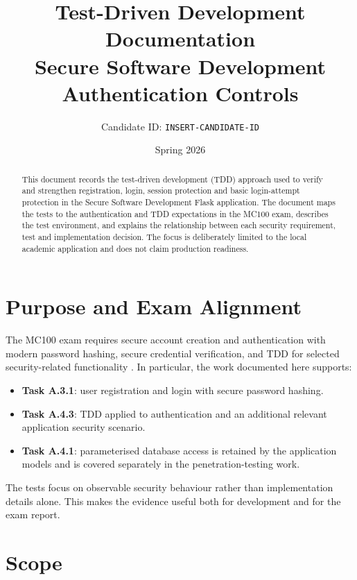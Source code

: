 \documentclass[11pt,a4paper]{article}
\title{Test-Driven Development Documentation\\
\large Secure Software Development Authentication Controls}
\author{Candidate ID: \texttt{INSERT-CANDIDATE-ID}}
\date{Spring 2026}
\begin{document}
\maketitle

\begin{abstract}
This document records the test-driven development (TDD) approach used to verify
and strengthen registration, login, session protection and basic login-attempt
protection in the Secure Software Development Flask application. The document
maps the tests to the authentication and TDD expectations in the MC100 exam,
describes the test environment, and explains the relationship between each
security requirement, test and implementation decision. The focus is deliberately
limited to the local academic application and does not claim production readiness.
\end{abstract}

\tableofcontents
\newpage

\section{Purpose and Exam Alignment}

The MC100 exam requires secure account creation and authentication with modern
password hashing, secure credential verification, and TDD for selected
security-related functionality \cite{mc100exam,mc100guidelines}. In particular,
the work documented here supports:

\begin{itemize}[leftmargin=*]
    \item \textbf{Task A.3.1}: user registration and login with secure password
    hashing.
    \item \textbf{Task A.4.3}: TDD applied to authentication and an additional
    relevant application security scenario.
    \item \textbf{Task A.4.1}: parameterised database access is retained by the
    application models and is covered separately in the penetration-testing work.
\end{itemize}

The tests focus on observable security behaviour rather than implementation
details alone. This makes the evidence useful both for development and for the
exam report.

\section{Scope}
\end{document}
